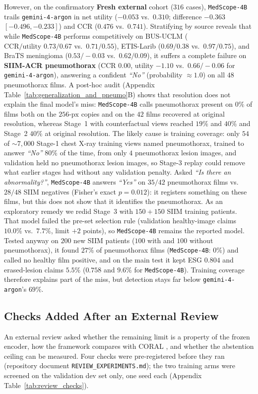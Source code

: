\documentclass{article} %
\begin{document}
However, on the confirmatory \textbf{Fresh external} cohort ($316$ cases), \texttt{MedScope-4B} trails \texttt{gemini-4-argon} in net utility ($-0.053$ vs.\ $0.310$; difference $-0.363$ $[-0.496, -0.233]$) and CCR ($0.476$ vs.\ $0.741$). Stratifying by source reveals that while \texttt{MedScope-4B} performs competitively on BUS-UCLM ($\text{CCR/utility } 0.73 / 0.67$ vs.\ $0.71 / 0.55$), ETIS-Larib ($0.69 / 0.38$ vs.\ $0.97 / 0.75$), and BraTS meningioma ($0.53 / -0.03$ vs.\ $0.62 / 0.09$), it suffers a complete failure on \textbf{SIIM-ACR pneumothorax} ($\text{CCR } 0.00$, utility $-1.10$ vs.\ $0.66 / -0.06$ for \texttt{gemini-4-argon}), answering a confident \emph{``No''} (probability $\approx 1.0$) on all $48$ pneumothorax films. A post-hoc audit (Appendix Table~\ref{tab:generalization_and_pneumo}B) shows that resolution does not explain the final model's miss: \texttt{MedScope-4B} calls pneumothorax present on $0\%$ of films both on the $256\text{-px}$ copies and on the $42$ films recovered at original resolution, whereas Stage~1 with counterfactual views reached $19\%$ and $40\%$ and Stage~2 $40\%$ at original resolution. The likely cause is training coverage: only $54$ of $\sim 7{,}000$ Stage-1 chest X-ray training views named pneumothorax, trained to answer \emph{``No''} $80\%$ of the time, from only $4$ pneumothorax lesion images, and validation held no pneumothorax lesion images, so Stage-3 replay could remove what earlier stages had without any validation penalty. Asked \emph{``Is there an abnormality?''}, \texttt{MedScope-4B} answers \emph{``Yes''} on $35/42$ pneumothorax films vs.\ $28/48$ SIIM negatives (Fisher's exact $p = 0.012$): it registers something on these films, but this does not show that it identifies the pneumothorax. As an exploratory remedy we redid Stage~3 with $150 + 150$ SIIM training patients. That model failed the pre-set selection rule (validation healthy-image claims $10.0\%$ vs.\ $7.7\%$, limit $+2$ points), so \texttt{MedScope-4B} remains the reported model. Tested anyway on $200$ new SIIM patients ($100$ with and $100$ without pneumothorax), it found $27\%$ of pneumothorax films (\texttt{MedScope-4B}: $0\%$) and called no healthy film positive, and on the main test it kept ESG $0.804$ and erased-lesion claims $5.5\%$ ($0.758$ and $9.6\%$ for \texttt{MedScope-4B}). Training coverage therefore explains part of the miss, but detection stays far below \texttt{gemini-4-argon}'s $69\%$.

\subsection{Checks Added After an External Review}
\label{subsec:exp_review}
An external review asked whether the remaining limit is a property of the frozen encoder, how the framework compares with CORAL \citep{zafar2026coral}, and whether the abstention ceiling can be measured. Four checks were pre-registered before they ran (repository document \texttt{REVIEW\_EXPERIMENTS.md}); the two training arms were screened on the validation dev set only, one seed each (Appendix Table~\ref{tab:review_checks}).
\end{document}
